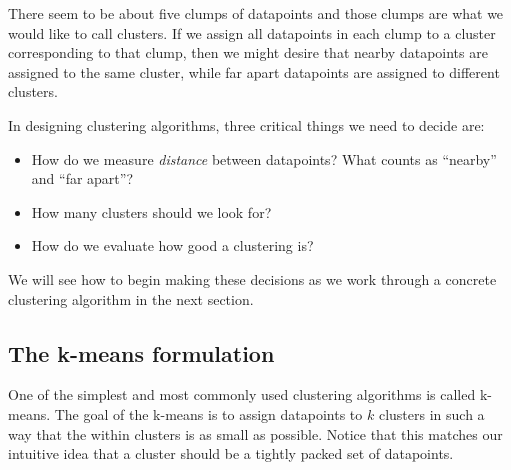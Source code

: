 There seem to be about five clumps of datapoints and those clumps are
what we would like to call clusters. If we assign all datapoints in
each clump to a cluster corresponding to that clump, then we might
desire that nearby datapoints are assigned to the same cluster, while
far apart datapoints are assigned to different clusters.

In designing clustering algorithms, three critical things we need to decide are:
\begin{itemize}
  \item How do we measure \textit{distance} between datapoints? What counts as ``nearby'' and ``far apart''?
  \item How many clusters should we look for?
  \item How do we evaluate how good a clustering is?
\end{itemize}

We will see how to begin making these decisions as we work through a
concrete clustering algorithm in the next section.

\subsection{The k-means formulation}




One of the simplest and most commonly used clustering algorithms is
called k-means. The goal of the k-means is to assign
datapoints to $k$ clusters in such a way that
the within clusters is as small as
possible. Notice that this matches our intuitive idea that a cluster
should be a tightly packed set of datapoints.

